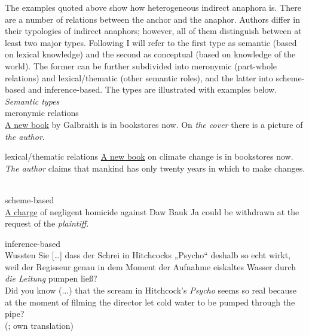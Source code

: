\documentclass[output=paper]{langsci/langscibook}
\begin{document}
The examples quoted above show how heterogeneous indirect anaphora is. There are a number of relations between the anchor and the anaphor. Authors differ in their typologies of indirect anaphors; however, all of them distinguish between at least two major types. Following \cite{schwarz:00} I will refer to the first type as semantic (based on lexical knowledge) and the second as conceptual (based on knowledge of the world). The former can be further subdivided into meronymic (part-whole relations) and lexical/thematic (other semantic roles), and the latter into scheme-based and inference-based. The types are illustrated with examples below.\\[-2mm]

\ea
{\emph{Semantic types}} \\
\ea meronymic relations\\
	\label{6ex:12}
	{\ul{A new book}} by Galbraith is in bookstores now. On {\emph{the cover}} there is a picture of {\emph{the author}}.

\ex lexical/thematic relations
	\label{6ex:13}
	{\ul{A new book}} on climate change is in bookstores now. {\emph{The author}} claims that mankind has only twenty years in which to make changes.
\z
\z

 \\
\ea scheme-based\\
	\label{6ex:14}
	{\ul{A charge}} of negligent homicide against Daw Bauk Ja could be withdrawn at the request of the {\emph{plaintiff}}.

\ex inference-based\\
	\label{6ex:15}
	Wussten Sie […] dass der Schrei in Hitchcocks „Psycho`` deshalb so echt wirkt, weil der Regisseur genau in dem Moment der Aufnahme eiskaltes Wasser durch {\emph{die Leitung}} pumpen ließ? \\
	Did you know (...) that the scream in Hitchcock's {\emph{Psycho}} seems so real because at the moment of filming the director let cold water to be pumped through the pipe?\\[1mm]
	(\citealt[][102]{consten:04}; own translation)
\z
\z
\end{document}
